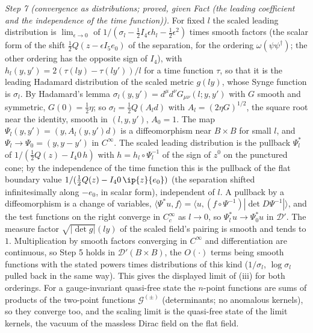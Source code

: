 \emph{Step 7 (convergence as distributions; proved, given Fact  (the leading coefficient and the independence of the time function)).} For fixed $l$ the scaled leading distribution is $\lim_{\epsilon\to 0}$ of $1/(\sigma_{l} - \tfrac12 I_{4}\epsilon h_{l} - \tfrac12\epsilon^{2})$ times smooth factors (the scalar form of the shift $\tfrac12 Q(z - \epsilon I_{5}e_{0})$ of the separation, for the ordering $\omega(\psi\psi^{\dagger})$; the other ordering has the opposite sign of $I_{4}$), with $h_{l}(y, y') = 2(\tau(ly) - \tau(ly'))/l$ for a time function $\tau$, so that it is the leading Hadamard distribution of the scaled metric $g(ly)$, whose Synge function is $\sigma_{l}$. By Hadamard's lemma $\sigma_{l}(y, y') = d^{\mu}d^{\nu}G_{\mu\nu}(l; y, y')$ with $G$ smooth and symmetric, $G(0) = \tfrac12\eta$; so $\sigma_{l} = \tfrac12 Q(A_{l}d)$ with $A_{l} = (2\eta G)^{1/2}$, the square root near the identity, smooth in $(l, y, y')$, $A_{0} = 1$. The map $\Psi_{l}(y, y') = (y, A_{l}(y, y')d)$ is a diffeomorphism near $B\times B$ for small $l$, and $\Psi_{l} \to \Psi_{0} = (y, y - y')$ in $C^{\infty}$. The scaled leading distribution is the pullback $\Psi_{l}^{*}$ of $1/(\tfrac12 Q(z) - I_{4}0\,h)$ with $h = h_{l}\circ\Psi_{l}^{-1}$ of the sign of $z^{0}$ on the punctured cone; by the independence of the time function this is the pullback of the flat boundary value $1/(\tfrac12 Q(z) - I_{4}0\,\ip{z}{e_{0}})$ (the separation shifted infinitesimally along $-e_{0}$, in scalar form), independent of $l$. A pullback by a diffeomorphism is a change of variables, $\langle\Psi^{*}u, f\rangle = \langle u, (f\circ\Psi^{-1})|\det D\Psi^{-1}|\rangle$, and the test functions on the right converge in $C^{\infty}_{c}$ as $l \to 0$, so $\Psi_{l}^{*}u \to \Psi_{0}^{*}u$ in $\mathcal{D}'$. The measure factor $\sqrt{|\det g|}(ly)$ of the scaled field's pairing is smooth and tends to $1$. Multiplication by smooth factors converging in $C^{\infty}$ and differentiation are continuous, so Step 5 holds in $\mathcal{D}'(B\times B)$, the $O(\cdot)$ terms being smooth functions with the stated powers times distributions of this kind ($1/\sigma_{l}$, $\log\sigma_{l}$ pulled back in the same way). This gives the displayed limit of (iii) for both orderings. For a gauge-invariant quasi-free state the $n$-point functions are sums of products of the two-point functions $\mathcal{G}^{(\pm)}$ (determinants; no anomalous kernels), so they converge too, and the scaling limit is the quasi-free state of the limit kernels, the vacuum of the massless Dirac field on the flat field.

